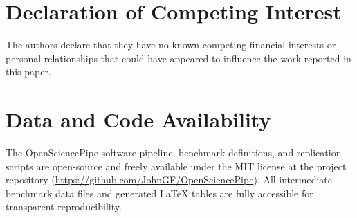\documentclass[preprint,12pt]{elsarticle}
\begin{document}
\section*{Declaration of Competing Interest}
The authors declare that they have no known competing financial interests or personal relationships that could have appeared to influence the work reported in this paper.

\section*{Data and Code Availability}
The OpenSciencePipe software pipeline, benchmark definitions, and replication scripts are open-source and freely available under the MIT license at the project repository (\url{https://github.com/JohnGF/OpenSciencePipe}). All intermediate benchmark data files and generated LaTeX tables are fully accessible for transparent reproducibility.
\end{document}
